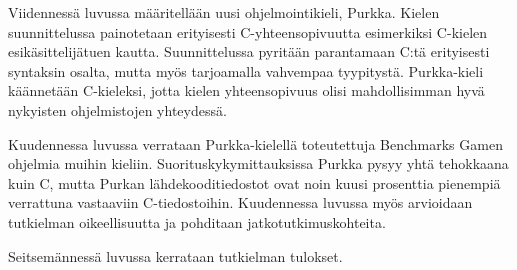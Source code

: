 Viidennessä luvussa määritellään uusi ohjelmointikieli, Purkka. Kielen
suunnittelussa painotetaan erityisesti C-yhteensopivuutta esimerkiksi C-kielen
esikäsittelijätuen kautta. Suunnittelussa pyritään parantamaan C:tä erityisesti
syntaksin osalta, mutta myös tarjoamalla vahvempaa tyypitystä. Purkka-kieli
käännetään C-kieleksi, jotta kielen yhteensopivuus olisi mahdollisimman hyvä
nykyisten ohjelmistojen yhteydessä.

Kuudennessa luvussa verrataan Purkka-kielellä toteutettuja Benchmarks Gamen
ohjelmia muihin kieliin. Suorituskykymittauksissa Purkka pysyy yhtä tehokkaana
kuin C, mutta Purkan lähdekooditiedostot ovat noin kuusi prosenttia pienempiä
verrattuna vastaaviin C-tiedostoihin. Kuudennessa luvussa myös arvioidaan
tutkielman oikeellisuutta ja pohditaan jatkotutkimuskohteita.

Seitsemännessä luvussa kerrataan tutkielman tulokset.
